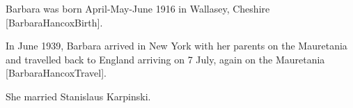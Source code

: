 
Barbara was born April-May-June 1916 	in Wallasey, Cheshire [BarbaraHancoxBirth].

In June 1939, Barbara arrived in New York with her parents on the Mauretania  and travelled back to England arriving on 7 July, again on the Mauretania [BarbaraHancoxTravel].

She married Stanislaus Karpinski.
